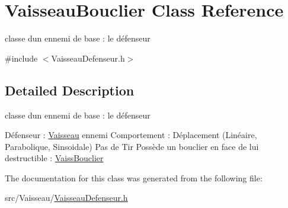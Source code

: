 \hypertarget{class_vaisseau_bouclier}{}\section{Vaisseau\+Bouclier Class Reference}
\label{class_vaisseau_bouclier}


classe d\textquotesingle{}un ennemi de base \+: le défenseur  




{\ttfamily \#include $<$Vaisseau\+Defenseur.\+h$>$}



\subsection{Detailed Description}
classe d\textquotesingle{}un ennemi de base \+: le défenseur 

Défenseur \+: \mbox{\hyperlink{class_vaisseau}{Vaisseau}} ennemi Comportement \+: Déplacement (Linéaire, Parabolique, Sinsoidale) Pas de Tir Possède un bouclier en face de lui destructible \+: \mbox{\hyperlink{class_vaiss_bouclier}{Vaiss\+Bouclier}} 

The documentation for this class was generated from the following file\+:\begin{DoxyCompactItemize}
\item 
src/\+Vaisseau/\mbox{\hyperlink{_vaisseau_defenseur_8h}{Vaisseau\+Defenseur.\+h}}\end{DoxyCompactItemize}
